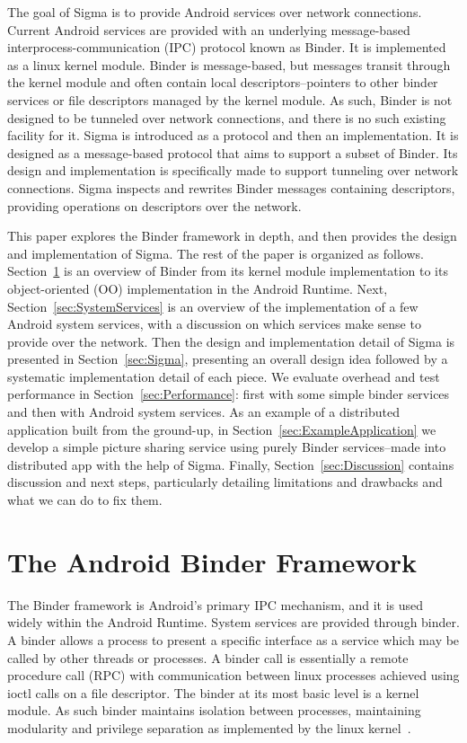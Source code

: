 \documentclass[prodmode]{acmlarge}
\begin{document}
The goal of Sigma is to provide Android services over network connections. Current Android services are provided with an underlying message-based interprocess-communication (IPC) protocol known as Binder. It is implemented as a linux kernel module. Binder is message-based, but messages transit through the kernel module and often contain local descriptors--pointers to other binder services or file descriptors managed by the kernel module. As such, Binder is not designed to be tunneled over network connections, and there is no such existing facility for it. Sigma is introduced as a protocol and then an implementation. It is designed as a message-based protocol that aims to support a subset of Binder. Its design and implementation is specifically made to support tunneling over network connections. Sigma inspects and rewrites Binder messages containing descriptors, providing operations on descriptors over the network.

This paper explores the Binder framework in depth, and then provides the design and implementation of Sigma. The rest of the paper is organized as follows. Section~\ref{sec:AndroidBinderFramework} is an overview of Binder from its kernel module implementation to its object-oriented (OO) implementation in the Android Runtime. Next, Section~\ref{sec:SystemServices} is an overview of the implementation of a few Android system services, with a discussion on which services make sense to provide over the network. Then the design and implementation detail of Sigma is presented in Section~\ref{sec:Sigma}, presenting an overall design idea followed by a systematic implementation detail of each piece. We evaluate overhead and test performance in Section~\ref{sec:Performance}: first with some simple binder services and then with Android system services. As an example of a distributed application built from the ground-up, in Section~\ref{sec:ExampleApplication} we develop a simple picture sharing service using purely Binder services--made into distributed app with the help of Sigma. Finally, Section~\ref{sec:Discussion} contains discussion and next steps, particularly detailing limitations and drawbacks and what we can do to fix them.

\section{The Android Binder Framework}
\label{sec:AndroidBinderFramework}
The Binder framework is Android's primary IPC mechanism, and it is used widely within the Android Runtime. System services are provided through binder. A binder allows a process to present a specific interface as a service which may be called by other threads or processes. A binder call is essentially a remote procedure call (RPC) with communication between linux processes achieved using ioctl calls on a file descriptor. The binder at its most basic level is a kernel module. As such binder maintains isolation between processes, maintaining modularity and privilege separation as implemented by the linux kernel~\cite{OpenBinder}.
\end{document}

